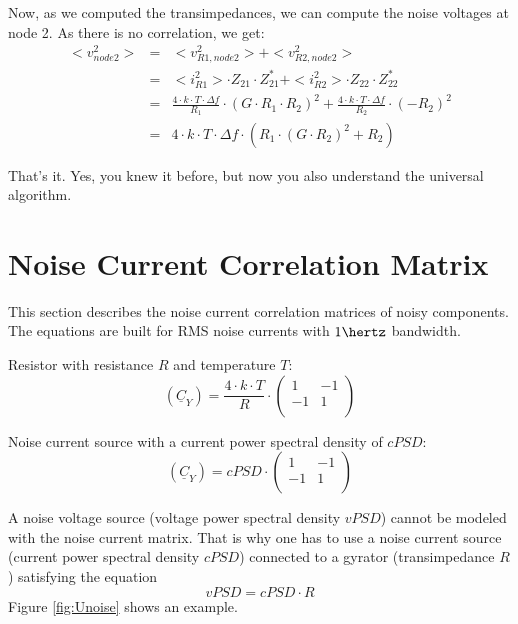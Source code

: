 Now, as we computed the transimpedances, we can compute the noise
voltages at node 2. As there is no correlation, we get:
\begin{eqnarray}
<v_{node2}^2> & = & <v_{R1,node2}^2> + <v_{R2,node2}^2> \\
  & = & <i_{R1}^2>\cdot Z_{21}\cdot Z_{21}^* + <i_{R2}^2>\cdot Z_{22}\cdot Z_{22}^* \\
  & = & \frac{4\cdot k\cdot T\cdot \Delta f}{R_1} \cdot (G\cdot R_1\cdot R_2)^2 +
        \frac{4\cdot k\cdot T\cdot \Delta f}{R_2} \cdot (-R_2)^2 \\
  & = & 4\cdot k\cdot T\cdot \Delta f\cdot \left( R_1\cdot (G\cdot R_2)^2 + R_2 \right)
\end{eqnarray}

That's it. Yes, you knew it before, but now you also understand
the universal algorithm.

\section{Noise Current Correlation Matrix}

This section describes the noise current correlation matrices of noisy
components.  The equations are built for RMS noise currents with
$1\hertz$ bandwidth.

\addvspace{12pt}

Resistor with resistance $R$ and temperature $T$:
\begin{equation}
(\underline{C}_Y) = \frac{4\cdot k\cdot T}{R} \cdot
\begin{pmatrix}
 1 & -1 \\
-1 &  1 \\
\end{pmatrix}
\end{equation}

Noise current source with a current power spectral density of $cPSD$:
\begin{equation}
(\underline{C}_Y) = cPSD \cdot
\begin{pmatrix}
 1 & -1 \\
-1 &  1 \\
\end{pmatrix}
\end{equation}

A noise voltage source (voltage power spectral density $vPSD$)
cannot be modeled with the noise current
matrix. That is why one has to use a noise current source
(current power spectral density $cPSD$) connected to a gyrator
(transimpedance $R$) satisfying the equation
\begin{equation}
vPSD = cPSD \cdot R
\end{equation}
Figure \ref{fig:Unoise} shows an example.

